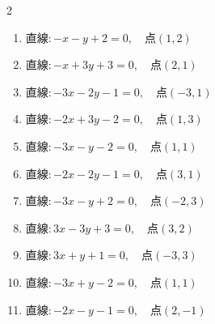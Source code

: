 \begin{multicols}{2}
\begin{enumerate}
  \item $直線:-x-y+2=0,\quad 点 ( 1, 2 )$


  \item $直線:-x+3y+3=0,\quad 点 ( 2, 1 )$


  \item $直線:-3x-2y-1=0,\quad 点 ( -3, 1 )$


  \item $直線:-2x+3y-2=0,\quad 点 ( 1, 3 )$


  \item $直線:-3x-y-2=0,\quad 点 ( 1, 1 )$


  \item $直線:-2x-2y-1=0,\quad 点 ( 3, 1 )$


\columnbreak %

\resetques

  \item $直線:-3x-y+2=0,\quad 点 ( -2, 3 )$


  \item $直線:3x-3y+3=0,\quad 点 ( 3, 2 )$


  \item $直線:3x+y+1=0,\quad 点 ( -3, 3 )$


  \item $直線:-3x+y-2=0,\quad 点 ( 1, 1 )$


  \item $直線:-2x-y-1=0,\quad 点 ( 2, -1 )$



\end{enumerate}
\end{multicols}
